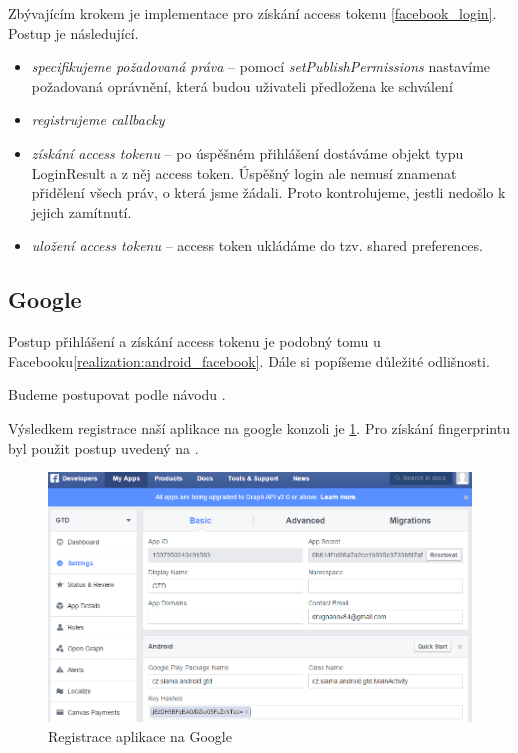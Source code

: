 \documentclass[thesis=B,czech]{FITthesis}[2012/06/26]
\begin{document}
Zbývajícím krokem je implementace pro získání access tokenu \ref{facebook_login}. Postup je následující. 
\begin{itemize}[nosep]
	\item \textit{specifikujeme požadovaná práva} -- pomocí \textit{setPublishPermissions} nastavíme požadovaná oprávnění, která budou uživateli předložena ke schválení 
	\item \textit{registrujeme callbacky}
	\item \textit{získání access tokenu} -- po úspěšném přihlášení dostáváme objekt typu LoginResult a z něj access token. Úspěšný login ale nemusí znamenat přidělení všech práv, o která jsme žádali. Proto kontrolujeme, jestli nedošlo k jejich zamítnutí.
	\item \textit{uložení access tokenu} -- access token ukládáme do tzv. shared preferences\cite{android_shared_prefereces}.
\end{itemize}



\subsection{Google}
\label{realization:android_google}

Postup přihlášení a získání access tokenu je podobný tomu u Facebooku\ref{realization:android_facebook}. Dále si popíšeme důležité odlišnosti. 

Budeme postupovat podle návodu \cite{android_google_guide}.

Výsledkem registrace naší aplikace na google konzoli je \ref{fig:google_registration}. Pro získání fingerprintu byl použit postup uvedený na \cite{android_google_fingerprint}.

\begin{figure}[h!]\centering
	\includegraphics[width=1\textwidth]{pictures/facebook_app_registration.png}
	\caption{Registrace aplikace na Google}
	\label{fig:google_registration}
\end{figure}
\end{document}

